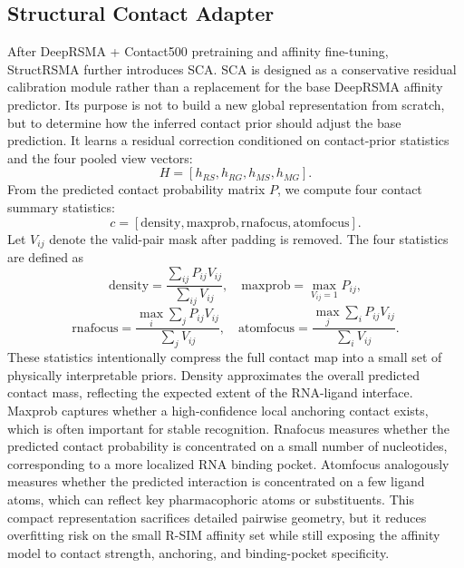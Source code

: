 ﻿\documentclass[journal=jcisd8,manuscript=article]{achemso}
\begin{document}
\subsection{Structural Contact Adapter}

After DeepRSMA + Contact500 pretraining and affinity fine-tuning, StructRSMA further introduces SCA. SCA is designed as a conservative residual calibration module rather than a replacement for the base DeepRSMA affinity predictor. Its purpose is not to build a new global representation from scratch, but to determine how the inferred contact prior should adjust the base prediction. It learns a residual correction conditioned on contact-prior statistics and the four pooled view vectors:
\begin{equation}
H=[h_{RS},h_{RG},h_{MS},h_{MG}].
\end{equation}
From the predicted contact probability matrix $P$, we compute four contact summary statistics:
\begin{equation}
c=[\mathrm{density},\mathrm{maxprob},\mathrm{rnafocus},\mathrm{atomfocus}].
\end{equation}
Let $V_{ij}$ denote the valid-pair mask after padding is removed. The four statistics are defined as
\begin{equation}
\mathrm{density}=\frac{\sum_{ij}P_{ij}V_{ij}}{\sum_{ij}V_{ij}}, \quad
\mathrm{maxprob}=\max_{V_{ij}=1}P_{ij},
\end{equation}
\begin{equation}
\mathrm{rnafocus}=\frac{\max_i\sum_jP_{ij}V_{ij}}{\sum_j V_{ij}}, \quad
\mathrm{atomfocus}=\frac{\max_j\sum_iP_{ij}V_{ij}}{\sum_i V_{ij}}.
\end{equation}
These statistics intentionally compress the full contact map into a small set of physically interpretable priors. Density approximates the overall predicted contact mass, reflecting the expected extent of the RNA-ligand interface. Maxprob captures whether a high-confidence local anchoring contact exists, which is often important for stable recognition. Rnafocus measures whether the predicted contact probability is concentrated on a small number of nucleotides, corresponding to a more localized RNA binding pocket. Atomfocus analogously measures whether the predicted interaction is concentrated on a few ligand atoms, which can reflect key pharmacophoric atoms or substituents. This compact representation sacrifices detailed pairwise geometry, but it reduces overfitting risk on the small R-SIM affinity set while still exposing the affinity model to contact strength, anchoring, and binding-pocket specificity.
\end{document}
